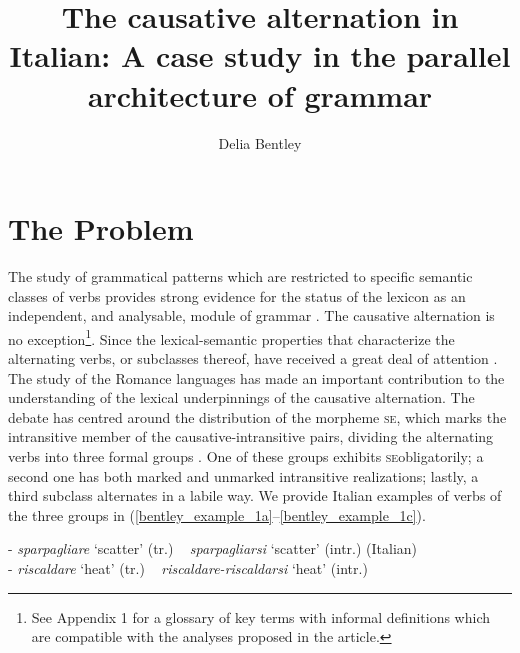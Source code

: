 \documentclass[output=paper,colorlinks,citecolor=brown
]{langscibook}
\author{Delia Bentley\orcid{}\affiliation{University of Manchester}}
\title[The causative alternation in Italian]{The causative alternation in Italian: A case study in the parallel architecture of grammar}
\begin{document}
\maketitle


\section{The Problem}
\label{bentley_section_1}
The study of grammatical patterns which are restricted to specific semantic classes of verbs provides strong evidence for the status of the lexicon as an independent, and analysable, module of grammar \citep{pinker1989learnability,pinker2013secret,levin1993english}. The causative alternation is no exception\footnote{See Appendix 1 for a glossary of key terms with informal definitions which are compatible with the analyses proposed in the article.}.  Since \citet[332–337]{jespersen1927modern} the lexical-semantic properties that characterize the alternating verbs, or subclasses thereof, have received a great deal of attention \citep[etc.]{haspelmath1993more,levin1995unaccusativity,kiparsky1997remarks,chierchia1989semantics,comrie2006transitivity,schafer2009causative,samardzic2012meaning}. The study of the Romance languages has made an important contribution to the understanding of the lexical underpinnings of the causative alternation. The debate has centred around the distribution of the morpheme \textsc{se}, which marks the intransitive member of the causative-intransitive pairs, dividing the alternating verbs into three formal groups \citep[etc.]{zribi1987reflexivite,labelle1992change,alexiadou2006properties, alexiadou2015external, legendre2010french,cennamo2011anticausative,cennamo2012aspectual,kailuweit2012construcciones,martin2014anticausatives,vivanco2021scalar}. One of these groups exhibits \textsc{se}obligatorily; a second one has both marked and unmarked intransitive realizations; lastly, a third subclass alternates in a labile way. We provide Italian examples of verbs of the three groups in (\ref{bentley_example_1a}--\ref{bentley_example_1c}).

\ea
\label{bentley_example_1}
\ea	\label{bentley_example_1a}  - \textit{sparpagliare} ‘scatter’ (tr.) ~ \textit{sparpagliarsi} ‘scatter’ (intr.) 	(Italian) \\

\ex	\label{bentley_example_1b} 
 - \textit{riscaldare} ‘heat’ (tr.) ~ \textit{riscaldare-riscaldarsi} ‘heat’ (intr.)  \\
\end{document}
